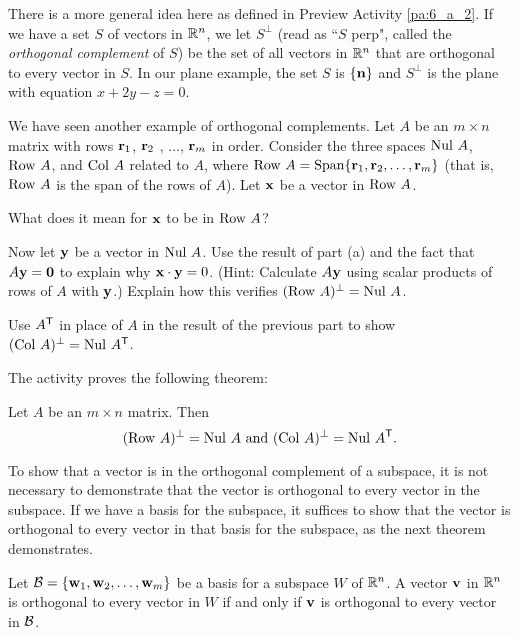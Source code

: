

There is a more general idea here as defined in Preview Activity \ref{pa:6_a_2}. If we have a set $S$ of vectors in $\mathbb{R}^n$, we let $S^{\perp}$ (read as ``$S$ perp", called the \emph{orthogonal complement} of $S$) be the set of all vectors in $\mathbb{R}^n$ that are orthogonal to every vector in $S$. In our plane example, the set $S$ is $\{\mathbf{n}\}$ and $S^{\perp}$ is the plane with equation $x+2y-z=0$.

\begin{activity} We have seen another example of orthogonal complements. Let $A$ be an $m \times n$ matrix with rows $\mathbf{r}_1$, $\mathbf{r}_2$ , $\ldots$, $\mathbf{r}_m$ in order. Consider the three spaces $\text{Nul } A$, $\text{Row } A$, and $\text{Col } A$ related to $A$, where $\text{Row } A = \text{Span}\{\mathbf{r}_1, \mathbf{r}_2, \ldots, \mathbf{r}_m\}$ (that is, $\text{Row } A$ is the span of the rows of $A$). Let $\mathbf{x}$ be a vector in $\text{Row } A$. 
	\ba
	\item What does it mean for $\mathbf{x}$ to be in $\text{Row } A$?

	\item Now let $\mathbf{y}$ be a vector in $\text{Nul } A$. Use the result of part (a) and the fact that $A \mathbf{y} = \mathbf{0}$ to explain why $\mathbf{x} \cdot \mathbf{y} = 0$. (Hint: Calculate $A \mathbf{y}$ using scalar products of rows of $A$ with $\mathbf{y}$.) Explain how this verifies $(\text{Row } A)^{\perp} = \text{Nul } A$. 

\item Use $A^{\mathsf{T}}$ in place of $A$ in the result of the previous part to show $(\text{Col } A)^{\perp} = \text{Nul } A^{\mathsf{T}}$.
	\ea

\end{activity}

The activity proves the following theorem:

\begin{theorem} \label{thm:6_a_orthogonal_subspaces} Let $A$ be an $m \times n$ matrix. Then
\[(\text{Row } A)^{\perp} = \text{Nul } A \text{ and } (\text{Col } A)^{\perp} = \text{Nul } A^{\mathsf{T}}.\]
\end{theorem}


To show that a vector is in the orthogonal complement of a subspace, it is not necessary to demonstrate that the vector is orthogonal to every vector in the subspace. If we have a basis for the subspace, it suffices to show that the vector is orthogonal to every vector in that basis for the subspace, as the next theorem demonstrates. 

\begin{theorem} \label{thm:6_a_dot_pd_orth_complement_basis} Let $\mathcal{B} = \{\mathbf{w}_1, \mathbf{w}_2, \ldots, \mathbf{w}_m\}$ be a basis for a subspace $W$ of $\mathbb{R}^n$. A vector $\mathbf{v}$ in $\mathbb{R}^n$ is orthogonal to every vector in $W$ if and only if $\mathbf{v}$ is orthogonal to every vector in $\mathcal{B}$.
\end{theorem}

